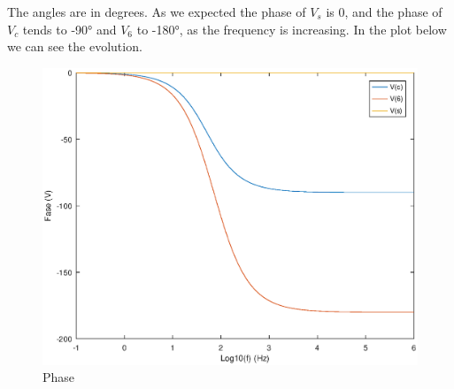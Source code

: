 The angles are in degrees. As we expected the phase of $V_{s}$ is 0, and the phase of $V_{c}$ tends to -90° and $V_{6}$ to -180°, as the frequency is increasing. In the plot below we can see the evolution.

\begin{figure}[h] \centering
\includegraphics[width=0.7\linewidth]{phase.eps}
\caption{Phase}
\label{fig:snat}
\end{figure}
